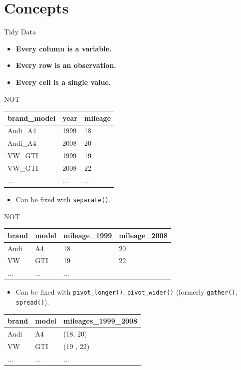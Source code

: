 \documentclass[12pt,aspectratio=169]{beamer}
\begin{document}
\section{Concepts}
\begin{frame}{Tidy Data}
\begin{itemize}
    \item<1-> \textbf{Every column is a variable.}
    \item<2-> \textbf{Every row is an observation.}
    \item<3-> \textbf{Every cell is a single value.}
\end{itemize}
{
NOT
\begin{table}[]
\begin{tabular}{lll}
brand\_model & year & mileage \\
\hline
Audi\_A4 & 1999 & 18      \\
Audi\_A4 & 2008 & 20      \\
VW\_GTI  & 1999 & 19      \\
VW\_GTI  & 2008 & 22      \\
...     & ...  & ...    
\end{tabular}
\end{table}
\begin{itemize}
    \item Can be fixed with \texttt{separate()}.
\end{itemize}
}
{
NOT
\begin{table}[]
\begin{tabular}{llll}
brand & model & mileage\_1999 & mileage\_2008 \\
\hline
Audi    & A4    & 18 & 20      \\
VW      & GTI   & 19 & 22      \\
...   & ...  & ...    
\end{tabular}
\end{table}
\begin{itemize}
    \item Can be fixed with \texttt{pivot\_longer()}, \texttt{pivot\_wider()} (formerly \texttt{gather()}, \texttt{spread()}).
\end{itemize}
}
{
\begin{table}[]
\begin{tabular}{lll}
brand & model & mileages\_1999\_2008 \\
\hline
Audi  & A4    & (18, 20)      \\
VW    & GTI   & (19 , 22)    \\
...   & ...   & ...  

\end{tabular}
\end{table}}
\end{frame}
\end{document}
